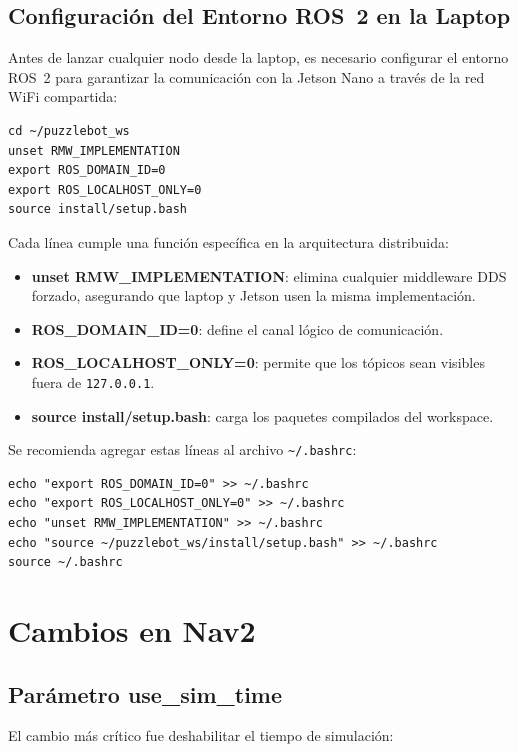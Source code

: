 \documentclass[conference]{IEEEtran}
\begin{document}
\subsection{Configuración del Entorno ROS~2 en la Laptop}

Antes de lanzar cualquier nodo desde la laptop, es necesario configurar el
entorno ROS~2 para garantizar la comunicación con la Jetson Nano a través de
la red WiFi compartida:

\begin{lstlisting}
cd ~/puzzlebot_ws
unset RMW_IMPLEMENTATION
export ROS_DOMAIN_ID=0
export ROS_LOCALHOST_ONLY=0
source install/setup.bash
\end{lstlisting}

Cada línea cumple una función específica en la arquitectura distribuida:

\begin{itemize}
  \item \textbf{unset RMW\_IMPLEMENTATION}: elimina cualquier middleware DDS
  forzado, asegurando que laptop y Jetson usen la misma implementación.
  \item \textbf{ROS\_DOMAIN\_ID=0}: define el canal lógico de comunicación.
  \item \textbf{ROS\_LOCALHOST\_ONLY=0}: permite que los tópicos sean visibles
  fuera de \texttt{127.0.0.1}.
  \item \textbf{source install/setup.bash}: carga los paquetes compilados del
  workspace.
\end{itemize}

Se recomienda agregar estas líneas al archivo \texttt{\textasciitilde/.bashrc}:

\begin{lstlisting}
echo "export ROS_DOMAIN_ID=0" >> ~/.bashrc
echo "export ROS_LOCALHOST_ONLY=0" >> ~/.bashrc
echo "unset RMW_IMPLEMENTATION" >> ~/.bashrc
echo "source ~/puzzlebot_ws/install/setup.bash" >> ~/.bashrc
source ~/.bashrc
\end{lstlisting}

\section{Cambios en Nav2}

\subsection{Parámetro use\_sim\_time}
El cambio más crítico fue deshabilitar el tiempo de simulación:
\end{document}
